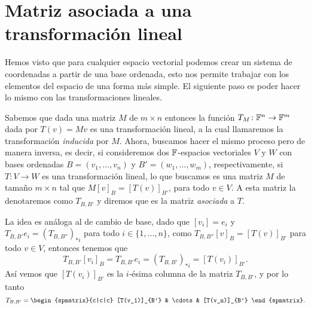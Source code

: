 \section{Matriz asociada a una transformación lineal}

Hemos visto que para cualquier espacio vectorial podemos crear un sistema de coordenadas a partir de una base ordenada, esto nos permite trabajar con los elementos del espacio de una forma más simple. El siguiente paso es poder hacer lo mismo con las transformaciones lineales.

Sabemos que dada una matriz $M$ de $m \times n$ entonces la función $T_M \colon \mathbb{F}^n \to \mathbb{F}^m$ dada por $T(v) = Mv$  es una transformación lineal, a la cual llamaremos la transformación \emph{inducida} por $M$. Ahora, buscamos hacer el mismo proceso pero de manera inversa, es decir, si consideremos dos $\mathbb{F}$-espacios vectoriales $V$ y $W$ con bases ordenadas $B = (v_1,\ldots,v_n)$ y $B' = (w_1,\ldots,w_m)$, respectivamente, si $T\colon V \to W$ es una transformación lineal, lo que buscamos es una matriz $M$ de tamaño $m\times n$ tal que $M[v]_B = [T(v)]_{B'}$, para todo $v \in V$. A esta matriz la denotaremos como $T_{B,B'}$ y diremos que es la matriz \emph{asociada} a $T$.

La idea es análoga al de cambio de base, dado que $[v_i] = e_i$ y $T_{B,B'}e_i = (T_{B,B''})_{*i}$ para todo $i \in \{1,\ldots,n\}$, como $T_{B,B''}[v]_B = [T(v)]_{B'}$ para todo $v \in V$, entonces tenemos que
  \[ T_{B,B'} [v_i]_B = T_{B,B'} e_i = (T_{B,B'})_{*i} = [T(v_i)]_{B'}. \]
Así vemos que $[T(v_i)]_{B'}$ es la $i$-ésima columna de la matriz $T_{B,B'}$, y por lo tanto
  \[ T_{B,B'} = \begin{spmatrix}{c|c|c}  [T(v_1)]_{B'} & \cdots & [T(v_n)]_{B'}  \end{spmatrix}. \]

